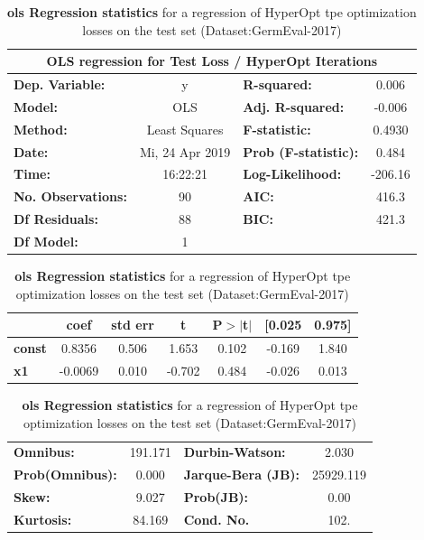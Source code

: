\begin{table}[H]
    \begin{center}
        \begin{tabular}{lclc}
        \toprule
        \multicolumn{4}{c}{OLS regression for Test Loss / HyperOpt Iterations} \\
        \midrule
        \textbf{Dep. Variable:}    &        y        & \textbf{  R-squared:        } &     0.006   \\
        \textbf{Model:}            &       OLS       & \textbf{  Adj. R-squared:   } &    -0.006   \\
        \textbf{Method:}           &  Least Squares  & \textbf{  F-statistic:      } &    0.4930   \\
        \textbf{Date:}             & Mi, 24 Apr 2019 & \textbf{  Prob (F-statistic):} &    0.484    \\
        \textbf{Time:}             &     16:22:21    & \textbf{  Log-Likelihood:   } &   -206.16   \\
        \textbf{No. Observations:} &          90     & \textbf{  AIC:              } &     416.3   \\
        \textbf{Df Residuals:}     &          88     & \textbf{  BIC:              } &     421.3   \\
        \textbf{Df Model:}         &           1     & \textbf{                     } &             \\
        \bottomrule
        \end{tabular}
        \begin{tabular}{lcccccc}
                    & \textbf{coef} & \textbf{std err} & \textbf{t} & \textbf{P$>$$|$t$|$} & \textbf{[0.025} & \textbf{0.975]}  \\
        \midrule
        \textbf{const} &       0.8356  &        0.506     &     1.653  &         0.102        &       -0.169    &        1.840     \\
        \textbf{x1}    &      -0.0069  &        0.010     &    -0.702  &         0.484        &       -0.026    &        0.013     \\
        \bottomrule
        \end{tabular}
        \begin{tabular}{lclc}
        \textbf{Omnibus:}       & 191.171 & \textbf{  Durbin-Watson:    } &     2.030  \\
        \textbf{Prob(Omnibus):} &   0.000 & \textbf{  Jarque-Bera (JB): } & 25929.119  \\
        \textbf{Skew:}          &   9.027 & \textbf{  Prob(JB):         } &      0.00  \\
        \textbf{Kurtosis:}      &  84.169 & \textbf{  Cond. No.          } &      102.  \\
        \bottomrule
        \end{tabular}
    \end{center}
    \caption{\textbf{\gls{ols} Regression statistics} for a regression of HyperOpt \gls{tpe} optimization losses on the test set {(Dataset:GermEval-2017)}}
    \label{tab:08_olsLossItTest}    
\end{table}

